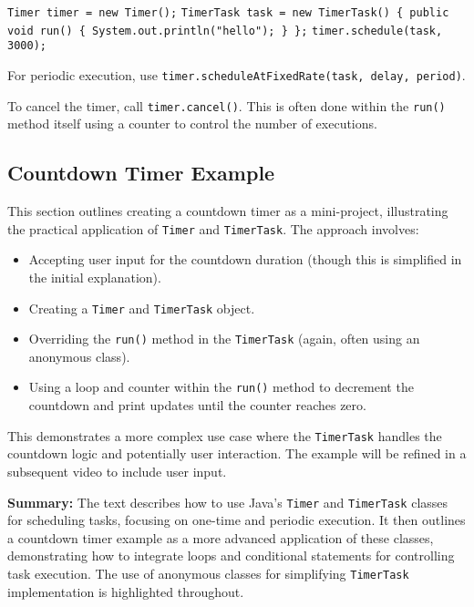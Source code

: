 \documentclass{article}
\begin{document}
\begin{itemize}
\texttt{Timer timer = new Timer();} \newline
\texttt{TimerTask task = new TimerTask() \{\newline
    \hspace*{0.5cm} public void run() \{\newline
    \hspace*{1cm} System.out.println("hello");\newline
    \hspace*{0.5cm} \}\newline
\};} \newline
\texttt{timer.schedule(task, 3000);}


For periodic execution,  use \texttt{timer.scheduleAtFixedRate(task, delay, period)}.

To cancel the timer, call \texttt{timer.cancel()}.  This is often done within the \texttt{run()} method itself using a counter to control the number of executions.


\subsection{Countdown Timer Example}

This section outlines creating a countdown timer as a mini-project, illustrating the practical application of \texttt{Timer} and \texttt{TimerTask}. The approach involves:

\begin{itemize}
    \item Accepting user input for the countdown duration (though this is simplified in the initial explanation).
    \item Creating a \texttt{Timer} and \texttt{TimerTask} object.
    \item Overriding the \texttt{run()} method in the \texttt{TimerTask} (again, often using an anonymous class).
    \item Using a loop and counter within the \texttt{run()} method to decrement the countdown and print updates until the counter reaches zero.
\end{itemize}

This demonstrates a more complex use case where the \texttt{TimerTask} handles the countdown logic and potentially user interaction. The example will be refined in a subsequent video to include user input.

\textbf{Summary:} The text describes how to use Java's \texttt{Timer} and \texttt{TimerTask} classes for scheduling tasks, focusing on one-time and periodic execution.  It then outlines a countdown timer example as a more advanced application of these classes, demonstrating how to integrate loops and conditional statements for controlling task execution.  The use of anonymous classes for simplifying \texttt{TimerTask} implementation is highlighted throughout.



\end{itemize}
\end{document}
